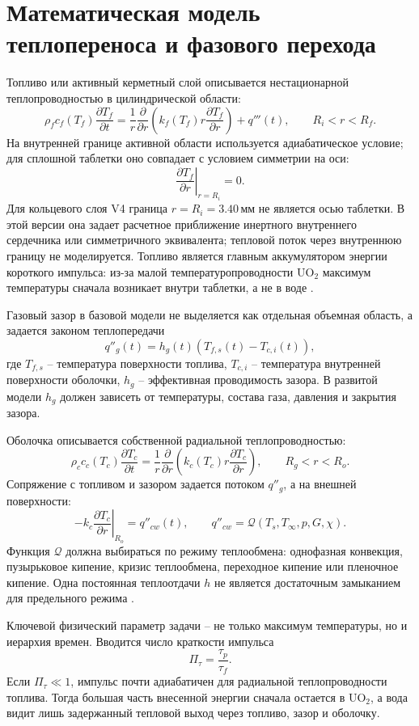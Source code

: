 \documentclass[12pt]{article}
\begin{document}
\section{Математическая модель теплопереноса и фазового перехода}

Топливо или активный керметный слой описывается нестационарной теплопроводностью в цилиндрической области:
\[
\rho_f c_f(T_f)\frac{\partial T_f}{\partial t}
=
\frac{1}{r}\frac{\partial}{\partial r}
\left(k_f(T_f)r\frac{\partial T_f}{\partial r}\right)
+q'''(t),\qquad R_i<r<R_f.
\]
На внутренней границе активной области используется адиабатическое условие; для сплошной таблетки оно совпадает с условием симметрии на оси:
\[
\left.\frac{\partial T_f}{\partial r}\right|_{r=R_i}=0.
\]
Для кольцевого слоя V4 граница \(r=R_i=3.40\,\mathrm{мм}\) не является осью таблетки. В этой версии она задает расчетное приближение инертного внутреннего сердечника или симметричного эквивалента; тепловой поток через внутреннюю границу не моделируется.
Топливо является главным аккумулятором энергии короткого импульса: из-за малой температуропроводности \(\mathrm{UO_2}\) максимум температуры сначала возникает внутри таблетки, а не в воде \cite{IAEATHPH2007,IAEATECDOC1496}.

Газовый зазор в базовой модели не выделяется как отдельная объемная область, а задается законом теплопередачи
\[
q''_g(t)=h_g(t)\left(T_{f,s}(t)-T_{c,i}(t)\right),
\]
где \(T_{f,s}\) -- температура поверхности топлива, \(T_{c,i}\) -- температура внутренней поверхности оболочки, \(h_g\) -- эффективная проводимость зазора. В развитой модели \(h_g\) должен зависеть от температуры, состава газа, давления и закрытия зазора.

Оболочка описывается собственной радиальной теплопроводностью:
\[
\rho_c c_c(T_c)\frac{\partial T_c}{\partial t}
=
\frac{1}{r}\frac{\partial}{\partial r}
\left(k_c(T_c)r\frac{\partial T_c}{\partial r}\right),
\qquad R_g<r<R_o.
\]
Сопряжение с топливом и зазором задается потоком \(q''_g\), а на внешней поверхности:
\[
-k_c\left.\frac{\partial T_c}{\partial r}\right|_{R_o}=q''_{cw}(t),
\qquad
q''_{cw}=\mathcal{Q}(T_s,T_\infty,p,G,\chi).
\]
Функция \(\mathcal{Q}\) должна выбираться по режиму теплообмена: однофазная конвекция, пузырьковое кипение, кризис теплообмена, переходное кипение или пленочное кипение. Одна постоянная теплоотдачи \(h\) не является достаточным замыканием для предельного режима \cite{IAEATECDOC1578}.

Ключевой физический параметр задачи -- не только максимум температуры, но и иерархия времен. Вводится число краткости импульса
\[
\Pi_\tau=\frac{\tau_p}{\tau_f}.
\]
Если \(\Pi_\tau\ll1\), импульс почти адиабатичен для радиальной теплопроводности топлива. Тогда большая часть внесенной энергии сначала остается в \(\mathrm{UO_2}\), а вода видит лишь задержанный тепловой выход через топливо, зазор и оболочку.
\end{document}

